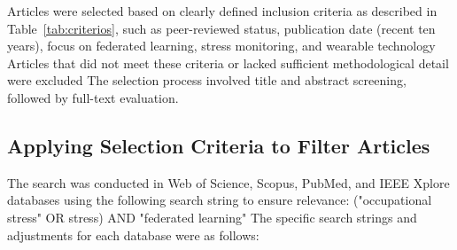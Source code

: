 \documentclass[12pt]{article}
\begin{document}
Articles were selected based on clearly defined inclusion criteria as described in Table~\ref{tab:criterios}, such as peer-reviewed status, publication date (recent ten years), focus on federated learning, stress monitoring, and wearable technology Articles that did not meet these criteria or lacked sufficient methodological detail were excluded The selection process involved title and abstract screening, followed by full-text evaluation.

\begin{table}[h!]
\centering
\caption{Inclusion and Exclusion Criteria}
\label{tab:criterios}
\end{table}

\subsection{Applying Selection Criteria to Filter Articles}

The search was conducted in Web of Science, Scopus, PubMed, and IEEE Xplore databases using the following search string to ensure relevance: ("occupational stress" OR stress) AND "federated learning" The specific search strings and adjustments for each database were as follows:
\end{document}
